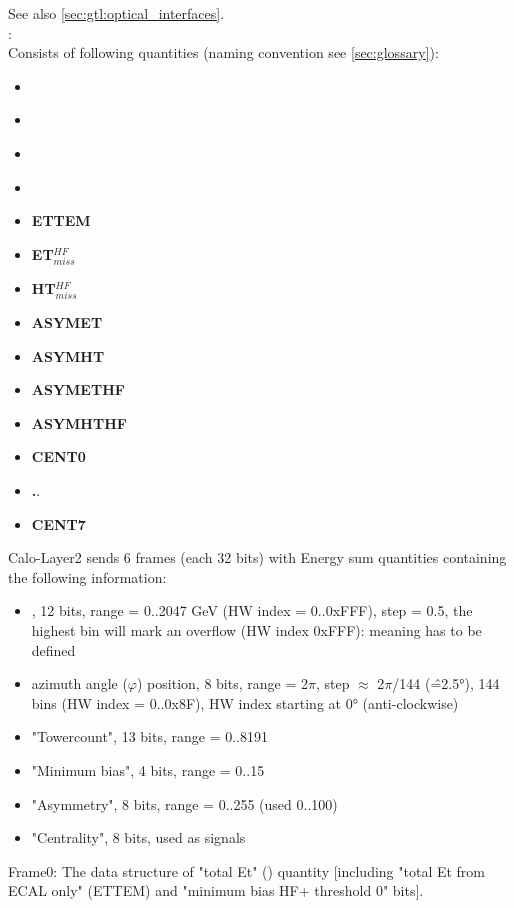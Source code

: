 See also \ref{sec:gtl:optical_interfaces}.\\
\textbf{\esums}:\\ Consists of following quantities (naming convention see \ref{sec:glossary}):
\begin{itemize}
\item \textbf{\ett}
\item \textbf{\htt}
\item \textbf{\etm}
\item \textbf{\htm}
\item \textbf{ETTEM}
\item \textbf{ET$_{miss}^{HF}$}
\item \textbf{HT$_{miss}^{HF}$}
\item \textbf{ASYMET}
\item \textbf{ASYMHT}
\item \textbf{ASYMETHF}
\item \textbf{ASYMHTHF}
\item \textbf{CENT0}
\item \textbf..
\item \textbf{CENT7}
\end{itemize}

Calo-Layer2 sends 6 frames (each 32 bits) with Energy sum quantities containing the following information:
\begin{itemize}
\item \et, 12 bits, range = 0..2047 GeV (HW index = 0..0xFFF), step = 0.5, the highest bin will mark an overflow (HW index 0xFFF): meaning has to be defined
\item azimuth angle ($\varphi$) position, 8 bits, range = 2$\pi$, step $\approx$ 2$\pi$/144 (\^=2.5°), 144 bins (HW index = 0..0x8F), HW index starting at 0° (anti-clockwise)
\item "Towercount", 13 bits, range = 0..8191
\item "Minimum bias", 4 bits, range = 0..15
\item "Asymmetry", 8 bits, range = 0..255 (used 0..100)
\item "Centrality", 8 bits, used as signals
\end{itemize}

Frame0: The data structure of "total Et" (\ett) quantity [including "total Et from ECAL only" (ETTEM) and "minimum bias HF+ threshold 0" bits].

